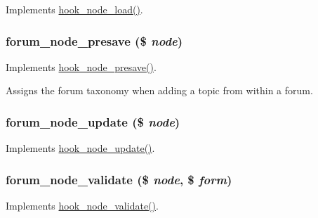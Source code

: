 \label{forum_8module_a4db7c947986e3cbbb6c81f247e53d7dd}
Implements \hyperlink{group__node__api__hooks_gad48bb14b68ed38526029d1f7ac2d2de4}{hook\_\-node\_\-load()}. \hypertarget{forum_8module_abb15dbd9bf5a680de97b16bff8b6bf0c}{
\subsubsection[{forum\_\-node\_\-presave}]{\setlength{\rightskip}{0pt plus 5cm}forum\_\-node\_\-presave (\$ {\em node})}}
\label{forum_8module_abb15dbd9bf5a680de97b16bff8b6bf0c}
Implements \hyperlink{group__node__api__hooks_gab339b1a1ce0e235d4a9c5a05e410dcd6}{hook\_\-node\_\-presave()}.

Assigns the forum taxonomy when adding a topic from within a forum. \hypertarget{forum_8module_a47cdf4da38d9d8cfb4426850a300ad21}{
\subsubsection[{forum\_\-node\_\-update}]{\setlength{\rightskip}{0pt plus 5cm}forum\_\-node\_\-update (\$ {\em node})}}
\label{forum_8module_a47cdf4da38d9d8cfb4426850a300ad21}
Implements \hyperlink{group__node__api__hooks_gac66c767cc922fcbfdaf17252e5d87d9d}{hook\_\-node\_\-update()}. \hypertarget{forum_8module_a202ce86f99c3afcdfb99948161cff803}{
\subsubsection[{forum\_\-node\_\-validate}]{\setlength{\rightskip}{0pt plus 5cm}forum\_\-node\_\-validate (\$ {\em node}, \/  \$ {\em form})}}
\label{forum_8module_a202ce86f99c3afcdfb99948161cff803}
Implements \hyperlink{group__node__api__hooks_gad26227eaf0dd513134767a11be40ab1d}{hook\_\-node\_\-validate()}.

